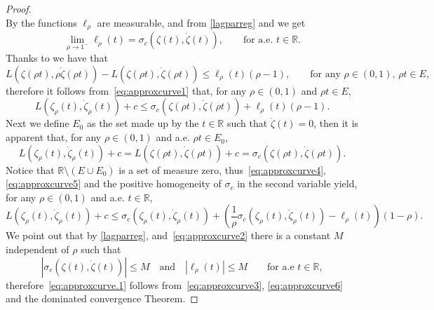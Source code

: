 \documentclass[11pt,a4paper,american]{article}
\newcommand{\Rds}{\mathds R}
\begin{document}
\begin{proof}
\begin{equation*}
        \end{equation*}
        By \cite[Theorem 1.3.28]{Molchanov17} the functions $\ell_\rho$ are measurable, and from \cref{lagparreg} and \cite[Theorem 2.8.1]{ClarkeLedyaevSternWolenski98} we get
        \begin{equation}\label{eq:approxcurve3}
            \lim_{\rho\to1^-}\ell_\rho(t)=\sigma_c\left(\zeta(t),\dot\zeta(t)\right),\qquad\text{for a.e. }t\in\Rds.
        \end{equation}
        Thanks to \cite[Proposition 2.4.3]{ClarkeLedyaevSternWolenski98} we have that
        \begin{equation*}
            L\left(\zeta(\rho t),\rho\dot\zeta(\rho t)\right)-L\left(\zeta(\rho t),\dot\zeta(\rho t)\right)\le\ell_\rho(t)(\rho-1),\qquad\text{for any }\rho\in(0,1),\,\rho t\in E,
        \end{equation*}
        therefore it follows from~\cref{eq:approxcurve1} that, for any $\rho\in(0,1)$ and $\rho t\in E$,
        \begin{equation}\label{eq:approxcurve4}
            L\left(\zeta_\rho(t),\dot\zeta_\rho(t)\right)+c\le\sigma_c\left(\zeta(\rho t),\dot\zeta(\rho t)\right)+\ell_\rho(t)(\rho-1).
        \end{equation}
        Next we define $E_0$ as the set made up by the $t\in\Rds$ such that $\dot\zeta(t)=0$, then it is apparent that, for any $\rho\in(0,1)$ and a.e. $\rho t\in E_0$,
        \begin{equation}\label{eq:approxcurve5}
            L\left(\zeta_\rho(t),\dot\zeta_\rho(t)\right)+c=L\left(\zeta(\rho t),\dot\zeta(\rho t)\right)+c=\sigma_c\left(\zeta(\rho t),\dot\zeta(\rho t)\right).
        \end{equation}
        Notice that $\Rds\setminus(E\cup E_0)$ is a set of measure zero, thus~\cref{eq:approxcurve4}, \cref{eq:approxcurve5} and the positive homogeneity of $\sigma_c$ in the second variable yield, for any $\rho\in(0,1)$ and a.e. $t\in\Rds$,
        \begin{equation}\label{eq:approxcurve6}
            L\left(\zeta_\rho(t),\dot\zeta_\rho(t)\right)+c\le\sigma_c\left(\zeta_\rho(t),\dot\zeta_\rho(t)\right)+\left(\frac1\rho\sigma_c\left(\zeta_\rho(t),\dot\zeta_\rho(t)\right)-\ell_\rho(t)\right)(1-\rho).
        \end{equation}
        We point out that by \cref{lagparreg}, \cite[Corollary to Proposition 2.2.6]{Clarke90} and~\cref{eq:approxcurve2} there is a constant $M$ independent of $\rho$ such that
        \begin{equation*}
            \left|\sigma_c\left(\zeta(t),\dot\zeta(t)\right)\right|\le M\quad\text{and}\quad|\ell_\rho(t)|\le M\qquad\text{for a.e }t\in\Rds,
        \end{equation*}
        therefore~\cref{eq:approxcurve.1} follows from~\cref{eq:approxcurve3}, \cref{eq:approxcurve6} and the dominated convergence Theorem.
    \end{proof}
\end{document}
